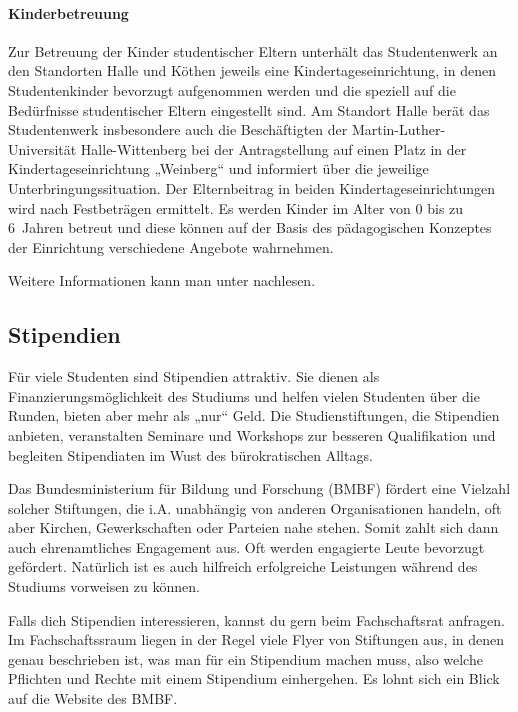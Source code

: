 \paragraph{Kinderbetreuung}
Zur Betreuung der Kinder studentischer Eltern unterhält das Studentenwerk an den Standorten Halle und Köthen jeweils eine Kindertageseinrichtung, in denen Studentenkinder bevorzugt aufgenommen werden und die speziell auf die Bedürfnisse studentischer Eltern eingestellt sind.
Am Standort Halle berät das Studentenwerk insbesondere auch die Beschäftigten der Martin-Luther-Universität Halle-Wittenberg bei der Antragstellung auf einen Platz in der Kindertageseinrichtung „Weinberg“ und informiert über die jeweilige Unterbringungssituation.
Der Elternbeitrag in beiden Kindertageseinrichtungen wird nach Festbeträgen ermittelt.
Es werden Kinder im Alter von 0 bis zu 6~Jahren betreut und diese können auf der Basis des pädagogischen Konzeptes der Einrichtung verschiedene Angebote wahrnehmen.

Weitere Informationen kann man unter
 nachlesen.

\subsection{Stipendien}

Für viele Studenten sind Stipendien attraktiv.
Sie dienen als Fi\-nan\-zier\-ungs\-mö\-glich\-keit des Studiums und helfen vielen Studenten über die Runden, bieten aber mehr als „nur“ Geld.
Die Studienstiftungen, die Stipendien anbieten, veranstalten Seminare und Workshops zur besseren Qualifikation und begleiten Stipendiaten im Wust des bürokratischen Alltags.

Das Bundesministerium für Bildung und Forschung (BMBF) fördert eine Vielzahl solcher Stiftungen, die i.A. unabhängig von anderen Organisationen handeln, oft aber Kirchen, Gewerkschaften oder Parteien nahe stehen.
Somit zahlt sich dann auch ehrenamtliches Engagement aus.
Oft werden engagierte Leute bevorzugt gefördert.
Natürlich ist es auch hilfreich erfolgreiche Leistungen während des Studiums vorweisen zu können.

Falls dich Stipendien interessieren, kannst du gern beim Fachschaftsrat anfragen.
Im Fachschaftssraum liegen in der Regel viele Flyer von Stiftungen aus, in denen genau beschrieben ist, was man für ein Stipendium machen muss, also welche Pflichten und Rechte mit einem Stipendium einhergehen.
Es lohnt sich ein Blick auf die Website des BMBF.

